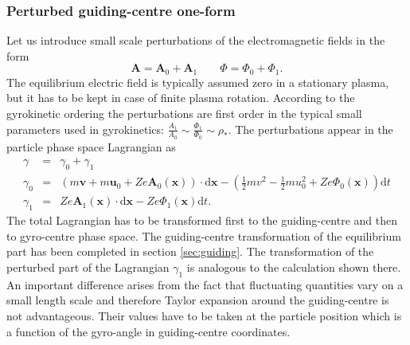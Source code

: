 \documentclass[a4paper,10pt]{article}
\renewcommand{\vec}[1]{\mathbf{#1}}
\begin{document}
\subsubsection{Perturbed guiding-centre one-form}
Let us introduce small scale perturbations of the electromagnetic fields in the form
\[ \mathbf{A} = \mathbf{A}_0 + \mathbf{A}_1 \qquad \Phi = \Phi_0 + \Phi_1.\]
The equilibrium electric field is typically assumed zero in a stationary plasma, but it has to be kept in case of finite plasma rotation. According to the gyrokinetic ordering the perturbations are first order in the typical small parameters used in gyrokinetics: $\frac{A_1}{A_0} \sim \frac{\Phi_1}{\Phi_0} \sim \rho_*$. The perturbations appear in the particle phase space Lagrangian as
\begin{eqnarray*}
	\gamma &=& \gamma_0 + \gamma_1 \\
	\gamma_0 &=& \left( m \mathbf{v} + m \vec{u}_0 + Z e \mathbf{A}_0(\mathbf{x}) \right) \cdot \mathrm{d} \mathbf{x} - \left( \frac{1}{2} m v^2 - \frac{1}{2} m u_0^2 + Z e \Phi_0(\mathbf{x}) \right) \mathrm{d}t \\
	\gamma_1 &=& Z e \mathbf{A}_1(\mathbf{x}) \cdot \mathrm{d} \mathbf{x} - Z e \Phi_1(\mathbf{x}) \mathrm{d}t.
\end{eqnarray*}
The total Lagrangian has to be transformed first to the guiding-centre and then to gyro-centre phase space. The guiding-centre transformation of the equilibrium part has been completed in section \ref{sec:guiding}. The transformation of the perturbed part of the Lagrangian $\gamma_1$ is analogous to the calculation shown there. An important difference arises from the fact that fluctuating quantities vary on a small length scale and therefore Taylor expansion around the guiding-centre is not advantageous. Their values have to be taken at the particle position which is a function of the gyro-angle in guiding-centre coordinates.
\end{document}
